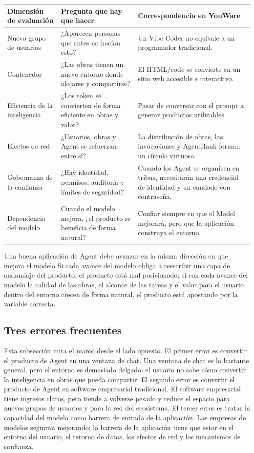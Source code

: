 \documentclass[a4paper]{article}
\begin{document}
\noindent\begin{tabularx}{\textwidth}{p{}p{}X}
\toprule
Dimensión de evaluación & Pregunta que hay que hacer & Correspondencia en YouWare \\
\midrule
Nuevo grupo de usuarios & ¿Aparecen personas que antes no hacían esto? & Un Vibe Coder no equivale a un programador tradicional. \\
Contenedor & ¿Las obras tienen un nuevo entorno donde alojarse y compartirse? & El HTML/code se convierte en un sitio web accesible e interactivo. \\
Eficiencia de la inteligencia & ¿Los token se convierten de forma eficiente en obras y valor? & Pasar de conversar con el prompt a generar productos utilizables. \\
Efectos de red & ¿Usuarios, obras y Agent se refuerzan entre sí? & La distribución de obras, las invocaciones y AgentRank forman un círculo virtuoso. \\
Gobernanza de la confianza & ¿Hay identidad, permisos, auditoría y límites de seguridad? & Cuando los Agent se organicen en tribus, necesitarán una credencial de identidad y un candado con contraseña. \\
Dependencia del modelo & Cuando el modelo mejora, ¿el producto se beneficia de forma natural? & Confiar siempre en que el Model mejorará, pero que la aplicación construya el entorno. \\
\bottomrule
\end{tabularx}

\begin{importantbox}{Una buena aplicación de Agent debe avanzar en la misma dirección en que mejora el modelo}
Si cada avance del modelo obliga a reescribir una capa de andamiaje del producto, el producto está mal posicionado; si con cada avance del modelo la calidad de las obras, el alcance de las tareas y el valor para el usuario dentro del entorno crecen de forma natural, el producto está apostando por la variable correcta.
\end{importantbox}

\subsection{Tres errores frecuentes}

Esta subsección mira el marco desde el lado opuesto. El primer error es convertir el producto de Agent en una ventana de chat. Una ventana de chat es lo bastante general, pero el entorno es demasiado delgado: el usuario no sabe cómo convertir la inteligencia en obras que pueda compartir. El segundo error es convertir el producto de Agent en software empresarial tradicional. El software empresarial tiene ingresos claros, pero tiende a volverse pesado y reduce el espacio para nuevos grupos de usuarios y para la red del ecosistema. El tercer error es tratar la capacidad del modelo como barrera de entrada de la aplicación. Las empresas de modelos seguirán mejorando; la barrera de la aplicación tiene que estar en el entorno del usuario, el retorno de datos, los efectos de red y los mecanismos de confianza.
\end{document}

